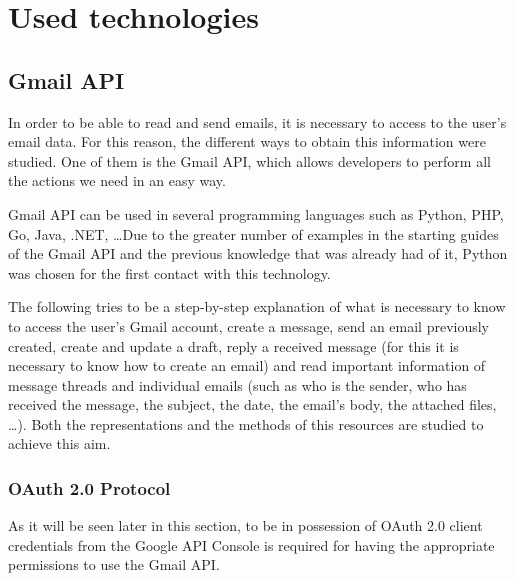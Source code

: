 \chapter{Used technologies}
\label{cap:usedtech}

\section{Gmail API}\label{sect:gmailapitech}
In order to be able to read and send emails, it is necessary to access to the user's email data. For this reason, the different ways to obtain this information were studied. One of them is the Gmail API, which allows developers to perform all the actions we need in an easy way.

Gmail API can be used in several programming languages such as Python, PHP, Go, Java, .NET, \ldots\phantom{ }Due to the greater number of examples in the starting guides of the Gmail API \citep{gmailAPI} and the previous knowledge that was already had of it, Python was chosen for the first contact with this technology.

The following tries to be a step-by-step explanation of what is necessary to know to access the user's Gmail account, create a message, send an email previously created, create and update a draft, reply a received message (for this it is necessary to know how to create an email) and read important information of message threads and individual emails (such as who is the sender, who has received the message, the subject, the date, the email's body, the attached files, \ldots). Both the representations and the methods of this resources are studied to achieve this aim.

\subsection{OAuth 2.0 Protocol}\label{ssect:oauth}
As it will be seen later in this section, to be in possession of OAuth 2.0 client credentials from the Google API Console is required for having the appropriate permissions to use the Gmail API.


